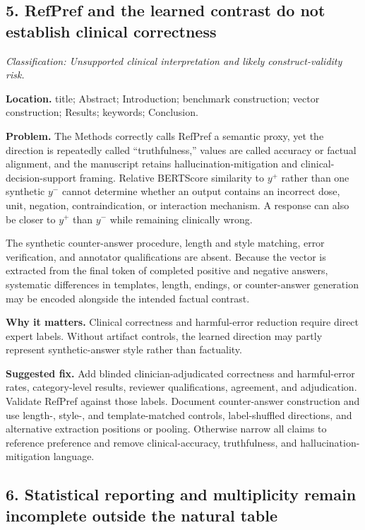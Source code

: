 \documentclass[11pt]{article}
\newcommand{\findinglabel}[1]{\textbf{#1}}
\newcommand{\classification}[1]{\textit{Classification: #1.}}
\begin{document}
\subsection*{5. RefPref and the learned contrast do not establish clinical correctness}

\classification{Unsupported clinical interpretation and likely construct-validity risk}

\findinglabel{Location.} title; Abstract; Introduction; benchmark construction; vector construction; Results; keywords; Conclusion.

\findinglabel{Problem.} The Methods correctly calls RefPref a semantic proxy, yet the direction is repeatedly called ``truthfulness,'' values are called accuracy or factual alignment, and the manuscript retains hallucination-mitigation and clinical-decision-support framing.  Relative BERTScore similarity to $y^+$ rather than one synthetic $y^-$ cannot determine whether an output contains an incorrect dose, unit, negation, contraindication, or interaction mechanism.  A response can also be closer to $y^+$ than $y^-$ while remaining clinically wrong.

The synthetic counter-answer procedure, length and style matching, error verification, and annotator qualifications are absent.  Because the vector is extracted from the final token of completed positive and negative answers, systematic differences in templates, length, endings, or counter-answer generation may be encoded alongside the intended factual contrast.

\findinglabel{Why it matters.} Clinical correctness and harmful-error reduction require direct expert labels.  Without artifact controls, the learned direction may partly represent synthetic-answer style rather than factuality.

\findinglabel{Suggested fix.} Add blinded clinician-adjudicated correctness and harmful-error rates, category-level results, reviewer qualifications, agreement, and adjudication.  Validate RefPref against those labels.  Document counter-answer construction and use length-, style-, and template-matched controls, label-shuffled directions, and alternative extraction positions or pooling.  Otherwise narrow all claims to reference preference and remove clinical-accuracy, truthfulness, and hallucination-mitigation language.

\subsection*{6. Statistical reporting and multiplicity remain incomplete outside the natural table}
\end{document}
